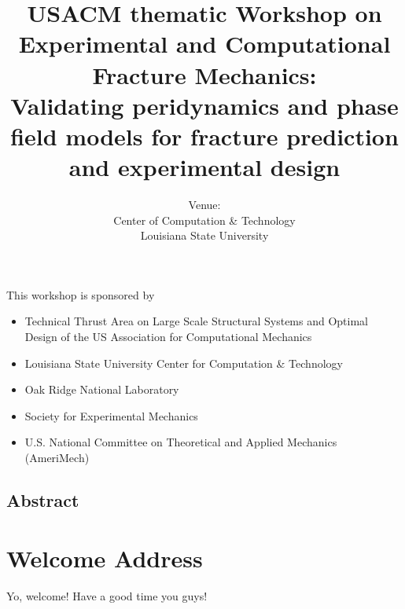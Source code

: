 \documentclass[12pt,letterpaper]{book}
\title{USACM thematic Workshop on Experimental and Computational Fracture Mechanics: \\
	\large Validating peridynamics and phase field models for fracture prediction and experimental design}
\author{Venue: \\ Center of Computation \& Technology \\ Louisiana State University}
\begin{document}
\frontmatter

\maketitle

This workshop is sponsored by

\begin{itemize}
\item Technical Thrust Area on Large Scale Structural Systems and Optimal Design of the US Association for Computational Mechanics
\item Louisiana State University Center for Computation \& Technology 
\item Oak Ridge National Laboratory
\item Society for Experimental Mechanics
\item U.S. National Committee on Theoretical and Applied Mechanics (AmeriMech)
\end{itemize}

\newpage

\section*{Abstract}


\chapter{Welcome Address}


Yo, welcome! Have a good time you guys!


%

\newpage
\end{document}
